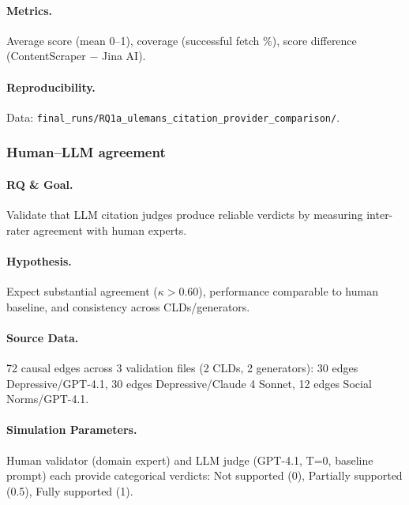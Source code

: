 \paragraph{Metrics.}
Average score (mean 0--1), coverage (successful fetch \%), score difference (ContentScraper $-$ Jina AI).

\paragraph{Reproducibility.}
Data: \texttt{final\_runs/RQ1a\_ulemans\_citation\_provider\_comparison/}.

\subsubsection{Human--LLM agreement}
\label{sec:human_llm_agreement}

\paragraph{RQ \& Goal.}
Validate that LLM citation judges produce reliable verdicts by measuring inter-rater agreement with human experts.

\paragraph{Hypothesis.}
Expect substantial agreement ($\kappa > 0.60$), performance comparable to human baseline, and consistency across CLDs/generators.

\paragraph{Source Data.}
72 causal edges across 3 validation files (2 CLDs, 2 generators): 30 edges Depressive/GPT-4.1, 30 edges Depressive/Claude 4 Sonnet, 12 edges Social Norms/GPT-4.1.

\paragraph{Simulation Parameters.}
Human validator (domain expert) and LLM judge (GPT-4.1, T=0, baseline prompt) each provide categorical verdicts: Not supported (0), Partially supported (0.5), Fully supported (1).

